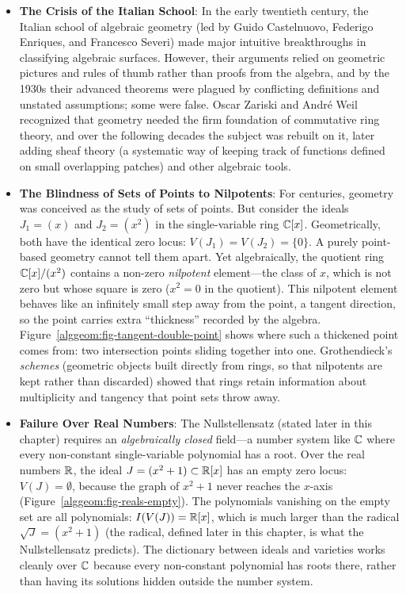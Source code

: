 \begin{itemize}
  \item \textbf{The Crisis of the Italian School}: In the early twentieth century, the Italian school of algebraic geometry (led by Guido Castelnuovo, Federigo Enriques, and Francesco Severi) made major intuitive breakthroughs in classifying algebraic surfaces. However, their arguments relied on geometric pictures and rules of thumb rather than proofs from the algebra, and by the 1930s their advanced theorems were plagued by conflicting definitions and unstated assumptions; some were false. Oscar Zariski and Andr\'e Weil recognized that geometry needed the firm foundation of commutative ring theory, and over the following decades the subject was rebuilt on it, later adding sheaf theory (a systematic way of keeping track of functions defined on small overlapping patches) and other algebraic tools.
  \item \textbf{The Blindness of Sets of Points to Nilpotents}: For centuries, geometry was conceived as the study of sets of points. But consider the ideals $J_1 = (x)$ and $J_2 = (x^2)$ in the single-variable ring $\mathbb{C}[x]$. Geometrically, both have the identical zero locus: $V(J_1) = V(J_2) = \{0\}$. A purely point-based geometry cannot tell them apart. Yet algebraically, the quotient ring $\mathbb{C}[x]/(x^2)$ contains a non-zero \emph{nilpotent} element---the class of $x$, which is not zero but whose square is zero ($x^2 = 0$ in the quotient). This nilpotent element behaves like an infinitely small step away from the point, a tangent direction, so the point carries extra ``thickness'' recorded by the algebra. Figure~\ref{alggeom:fig-tangent-double-point} shows where such a thickened point comes from: two intersection points sliding together into one. Grothendieck's \emph{schemes} (geometric objects built directly from rings, so that nilpotents are kept rather than discarded) showed that rings retain information about multiplicity and tangency that point sets throw away.
  \item \textbf{Failure Over Real Numbers}: The Nullstellensatz (stated later in this chapter) requires an \emph{algebraically closed} field---a number system like $\mathbb{C}$ where every non-constant single-variable polynomial has a root. Over the real numbers $\mathbb{R}$, the ideal $J = (x^2 + 1) \subset \mathbb{R}[x]$ has an empty zero locus: $V(J) = \emptyset$, because the graph of $x^2 + 1$ never reaches the $x$-axis (Figure~\ref{alggeom:fig-reals-empty}). The polynomials vanishing on the empty set are all polynomials: $I(V(J)) = \mathbb{R}[x]$, which is much larger than the radical $\sqrt{J} = (x^2 + 1)$ (the radical, defined later in this chapter, is what the Nullstellensatz predicts). The dictionary between ideals and varieties works cleanly over $\mathbb{C}$ because every non-constant polynomial has roots there, rather than having its solutions hidden outside the number system.
\end{itemize}

